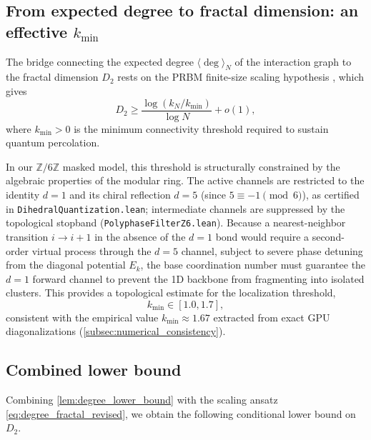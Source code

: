 \documentclass[11pt,a4paper]{article}
\newcommand{\Zmod}{\mathbb{Z}/6\mathbb{Z}}
\begin{document}
\subsection{From expected degree to fractal dimension: an effective \texorpdfstring{$k_{\min}$}{k\_min}}
\label{subsec:degree_to_fractal}

The bridge connecting the expected degree $\langle \deg \rangle_N$ of the interaction graph to the fractal dimension $D_2$ rests on the PRBM finite-size scaling hypothesis \cite{Mirlin1996}, which gives
\begin{equation}
D_2 \geq \frac{\log(k_N / k_{\min})}{\log N} + o(1),
\label{eq:degree_fractal_revised}
\end{equation}
where $k_{\min} > 0$ is the minimum connectivity threshold required to sustain quantum percolation.

In our $\Zmod$ masked model, this threshold is structurally constrained by the algebraic properties of the modular ring. The active channels are restricted to the identity $d=1$ and its chiral reflection $d=5$ (since $5 \equiv -1 \pmod 6$), as certified in \texttt{DihedralQuantization.lean}; intermediate channels are suppressed by the topological stopband (\texttt{PolyphaseFilterZ6.lean}). Because a nearest-neighbor transition $i \to i+1$ in the absence of the $d=1$ bond would require a second-order virtual process through the $d=5$ channel, subject to severe phase detuning from the diagonal potential $E_k$, the base coordination number must guarantee the $d=1$ forward channel to prevent the 1D backbone from fragmenting into isolated clusters. This provides a topological estimate for the localization threshold,
\begin{equation}
k_{\min} \in [1.0, 1.7],
\end{equation}
consistent with the empirical value $k_{\min} \approx 1.67$ extracted from exact GPU diagonalizations (\cref{subsec:numerical_consistency}).

\subsection{Combined lower bound}
\label{subsec:combined_bound}

Combining \cref{lem:degree_lower_bound} with the scaling ansatz \cref{eq:degree_fractal_revised}, we obtain the following conditional lower bound on $D_2$.
\end{document}

